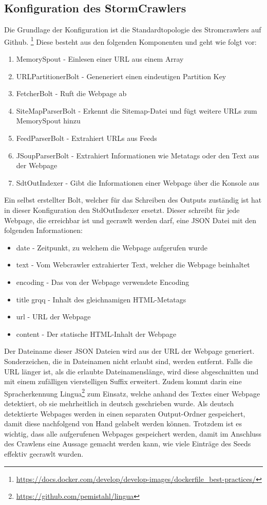 \subsection{Konfiguration des StormCrawlers}
Die Grundlage der Konfiguration ist die Standardtopologie des Stromcrawlers auf Github.
\footnote{\url{https://docs.docker.com/develop/develop-images/dockerfile_best-practices/}}
Diese besteht aus den folgenden Komponenten und geht wie folgt vor:
\begin{enumerate}
	\item MemorySpout - Einlesen einer URL aus einem Array
	\item URLPartitionerBolt - Geneneriert einen eindeutigen Partition Key
	\item FetcherBolt - Ruft die Webpage ab
	\item SiteMapParserBolt - Erkennt die Sitemap-Datei und fügt weitere URLs zum MemorySpout hinzu
	\item FeedParserBolt - Extrahiert URLs aus Feeds
	\item JSoupParserBolt - Extrahiert Informationen wie Metatags oder den Text aus der Webpage
	\item SdtOutIndexer - Gibt die Informationen einer Webpage über die Konsole aus
\end{enumerate}
Ein selbst erstellter Bolt, welcher für das Schreiben des Outputs zuständig ist hat in dieser Konfiguration den StdOutIndexer ersetzt.
Dieser schreibt für jede Webpage, die erreichbar ist und gecrawlt werden darf, eine JSON Datei mit den folgenden Informationen:
\begin{itemize}
	\item \glqq date\grqq{} - Zeitpunkt, zu welchem die Webpage aufgerufen wurde
	\item \glqq text\grqq{} - Vom Webcrawler extrahierter Text, welcher die Webpage beinhaltet
	\item \glqq encoding\grqq{} - Das von der Webpage verwendete Encoding
	\item \glqq title grqq{} - Inhalt des gleichnamigen HTML-Metatags
	\item \glqq url\grqq{} - URL der Webpage
	\item \glqq content\grqq{} - Der statische HTML-Inhalt der Webpage	
\end{itemize}
Der Dateiname dieser JSON Dateien wird aus der URL der Webpage generiert. 
Sonderzeichen, die in Dateinamen nicht erlaubt sind, werden entfernt. Falls die URL länger ist, als die erlaubte Dateinamenslänge, wird diese abgeschnitten und mit einem zufälligen vierstelligen Suffix erweitert.
Zudem kommt darin eine Spracherkennung \glqq Lingua\footnote{\url{https://github.com/pemistahl/lingua}}\grqq{} zum Einsatz, welche anhand des Textes einer Webpage detektiert, ob sie mehrheitlich in deutsch geschrieben wurde.
Als deutsch detektierte Webpages werden in einen separaten Output-Ordner gespeichert, damit diese nachfolgend von Hand gelabelt werden können.
Trotzdem ist es wichtig, dass alle aufgerufenen Webpages gespeichert werden, damit im Anschluss des Crawlens eine Aussage gemacht werden kann, wie viele Einträge des Seeds effektiv gecrawlt wurden.

